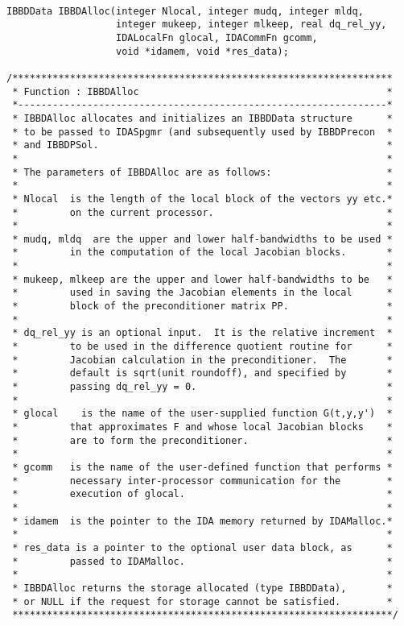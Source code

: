 \begin{verbatim}

IBBDData IBBDAlloc(integer Nlocal, integer mudq, integer mldq, 
                   integer mukeep, integer mlkeep, real dq_rel_yy, 
                   IDALocalFn glocal, IDACommFn gcomm, 
                   void *idamem, void *res_data);

/******************************************************************
 * Function : IBBDAlloc                                           *
 *----------------------------------------------------------------*
 * IBBDAlloc allocates and initializes an IBBDData structure      *
 * to be passed to IDASpgmr (and subsequently used by IBBDPrecon  *
 * and IBBDPSol.                                                  *
 *                                                                *
 * The parameters of IBBDAlloc are as follows:                    *
 *                                                                *
 * Nlocal  is the length of the local block of the vectors yy etc.*
 *         on the current processor.                              *
 *                                                                *
 * mudq, mldq  are the upper and lower half-bandwidths to be used *
 *         in the computation of the local Jacobian blocks.       *
 *                                                                *
 * mukeep, mlkeep are the upper and lower half-bandwidths to be   *
 *         used in saving the Jacobian elements in the local      *
 *         block of the preconditioner matrix PP.                 *
 *                                                                *
 * dq_rel_yy is an optional input.  It is the relative increment  *
 *         to be used in the difference quotient routine for      *
 *         Jacobian calculation in the preconditioner.  The       *
 *         default is sqrt(unit roundoff), and specified by       *
 *         passing dq_rel_yy = 0.                                 *
 *                                                                *
 * glocal    is the name of the user-supplied function G(t,y,y')  *
 *         that approximates F and whose local Jacobian blocks    *
 *         are to form the preconditioner.                        *
 *                                                                *
 * gcomm   is the name of the user-defined function that performs *
 *         necessary inter-processor communication for the        *
 *         execution of glocal.                                   *
 *                                                                *
 * idamem  is the pointer to the IDA memory returned by IDAMalloc.*
 *                                                                *
 * res_data is a pointer to the optional user data block, as      *
 *         passed to IDAMalloc.                                   *
 *                                                                *
 * IBBDAlloc returns the storage allocated (type IBBDData),       *
 * or NULL if the request for storage cannot be satisfied.        *
 ******************************************************************/

\end{verbatim}

